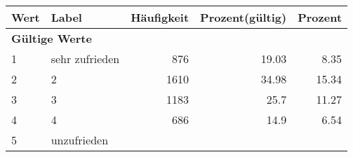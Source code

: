     \begin{longtable}{lXrrr}
     \toprule
     \textbf{Wert} & \textbf{Label} & \textbf{Häufigkeit} & \textbf{Prozent(gültig)} & \textbf{Prozent} \\
     \endhead
     \midrule
     \multicolumn{5}{l}{\textbf{Gültige Werte}}\\

     1 &
     \multicolumn{1}{X}{ sehr zufrieden   } &


       \num{876} &
       \num[round-mode=places,round-precision=2]{19.03} &
         \num[round-mode=places,round-precision=2]{8.35} \\

     2 &
     \multicolumn{1}{X}{ 2   } &


       \num{1610} &
       \num[round-mode=places,round-precision=2]{34.98} &
         \num[round-mode=places,round-precision=2]{15.34} \\

     3 &
     \multicolumn{1}{X}{ 3   } &


       \num{1183} &
       \num[round-mode=places,round-precision=2]{25.7} &
         \num[round-mode=places,round-precision=2]{11.27} \\

     4 &
     \multicolumn{1}{X}{ 4   } &


       \num{686} &
       \num[round-mode=places,round-precision=2]{14.9} &
         \num[round-mode=places,round-precision=2]{6.54} \\

     5 &
     \multicolumn{1}{X}{ unzufrieden   } &



\end{longtable}
